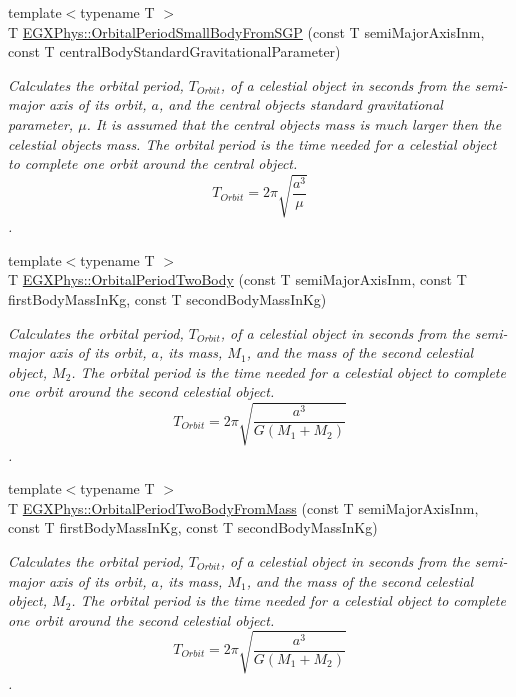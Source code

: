 \begin{DoxyCompactItemize}
{\footnotesize template$<$typename T $>$ }\\T \mbox{\hyperlink{group___e_g_x_phys-_astrophysic-_orbital_period_gab3773d2109aef45ef4649b56e36d13f3}{E\+G\+X\+Phys\+::\+Orbital\+Period\+Small\+Body\+From\+S\+GP}} (const T semi\+Major\+Axis\+Inm, const T central\+Body\+Standard\+Gravitational\+Parameter)
\begin{DoxyCompactList}\small\item\em Calculates the orbital period, $T_{Orbit}$, of a celestial object in seconds from the semi-\/major axis of its orbit, $a$, and the central object\textquotesingle{}s standard gravitational parameter, $\mu$. It is assumed that the central object\textquotesingle{}s mass is much larger then the celestial objects mass. The orbital period is the time needed for a celestial object to complete one orbit around the central object. \[ T_{Orbit}=2\pi\sqrt{\dfrac{a^3}{\mu}}\]. \end{DoxyCompactList}\item 
{\footnotesize template$<$typename T $>$ }\\T \mbox{\hyperlink{group___e_g_x_phys-_astrophysic-_orbital_period_ga60d2541fdf2108542e52879ae907d81c}{E\+G\+X\+Phys\+::\+Orbital\+Period\+Two\+Body}} (const T semi\+Major\+Axis\+Inm, const T first\+Body\+Mass\+In\+Kg, const T second\+Body\+Mass\+In\+Kg)
\begin{DoxyCompactList}\small\item\em Calculates the orbital period, $T_{Orbit}$, of a celestial object in seconds from the semi-\/major axis of its orbit, $a$, its mass, $M_1$, and the mass of the second celestial object, $M_2$. The orbital period is the time needed for a celestial object to complete one orbit around the second celestial object. \[ T_{Orbit}=2\pi\sqrt{\dfrac{a^3}{G(M_1 + M_2)}}\]. \end{DoxyCompactList}\item 
{\footnotesize template$<$typename T $>$ }\\T \mbox{\hyperlink{group___e_g_x_phys-_astrophysic-_orbital_period_ga6ec6ae4e31d99bf4d1a27f708dd3247d}{E\+G\+X\+Phys\+::\+Orbital\+Period\+Two\+Body\+From\+Mass}} (const T semi\+Major\+Axis\+Inm, const T first\+Body\+Mass\+In\+Kg, const T second\+Body\+Mass\+In\+Kg)
\begin{DoxyCompactList}\small\item\em Calculates the orbital period, $T_{Orbit}$, of a celestial object in seconds from the semi-\/major axis of its orbit, $a$, its mass, $M_1$, and the mass of the second celestial object, $M_2$. The orbital period is the time needed for a celestial object to complete one orbit around the second celestial object. \[ T_{Orbit}=2\pi\sqrt{\dfrac{a^3}{G(M_1 + M_2)}}\]. \end{DoxyCompactList}\item 

\end{DoxyCompactItemize}
